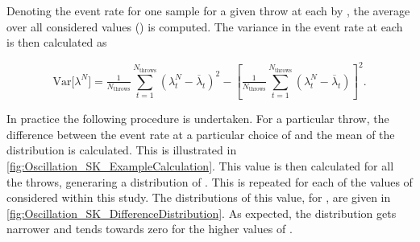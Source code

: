 Denoting the event rate for one sample for a given throw  at each  by , the average over all considered  values () is computed. The variance in the event rate at each  is then calculated as

\begin{equation}
  \mathrm{Var}\Big[\lambda^{N}\Big] = \tfrac{1}{N_\mathrm{throws}} \sum_{t=1}^{N_\mathrm{throws}} \left(\lambda_t^{N} - \overline \lambda_t\right)^2 - \left[\tfrac{1}{N_\mathrm{throws}} \sum_{t=1}^{N_\mathrm{throws}} \left(\lambda_t^{N} - \overline \lambda_t\right)\right]^2 .
  \label{eq:Oscillation_SK_Variance}
\end{equation}


In practice the following procedure is undertaken. For a particular throw, the difference between the event rate at a particular choice of  and the mean of the distribution is calculated. This is illustrated in \autoref{fig:Oscillation_SK_ExampleCalculation}. This value is then calculated for all the  throws, generaring a distribution of . This is repeated for each of the values of  considered within this study. The distributions of this value, for , are given in \autoref{fig:Oscillation_SK_DifferenceDistribution}. As expected, the distribution gets narrower and tends towards zero for the higher values of . 

